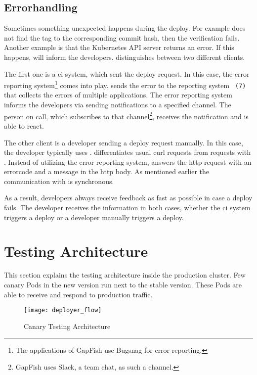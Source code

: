 \subsection{Errorhandling}

Sometimes something unexpected happens during the deploy. For example \deployer{} does not
find the tag to the corresponding commit hash, then the verification fails. Another
example is that the Kubernetes API server returns an error. If this happens, \deployer{} will
inform the developers. \deployer{} distinguishes between two different clients.

The first one is a \gls{ci} system, which sent the deploy request. In this case,
the error reporting system\footnote{The
  applications of GapFish use Bugsnag for error reporting.} comes into play. \deployer{} sends the
error to the reporting system ~\texttt{(7)} that collects the errors of multiple
applications. The error reporting system informs the developers via sending notifications to a
specified channel. The person on call, which subscribes to that channel\footnote{GapFish uses Slack, a team chat, as such a channel.}, receives the notification and is able to react.

The other client is a developer sending a deploy request manually. In this case, the
developer typically uses \depctl{}. \deployer{} differentiates usual curl requests from
requests with \depctl{}. Instead of utilizing the error reporting system, \deployer{} answers
the \gls{http} request with an errorcode and a message in the \gls{http} body. As mentioned earlier
the communication with \deployer{} is synchronous.

As a result, developers always receive feedback as fast as possible in case a deploy
fails. The developer receives the information in both cases, whether the \gls{ci} system
triggers a deploy or a developer manually triggers a deploy.

\section{Testing Architecture}
\label{test_architecture}

This section explains the testing architecture inside the production cluster. Few canary
Pods in the new version run next to the stable version. These Pods are able to receive and
respond to production traffic.

\begin{figure}[htbp] \centering \texttt{[image: deployer\_flow]}
  \caption{Canary Testing Architecture}
  \label{fig:testing_flow}
\end{figure}



